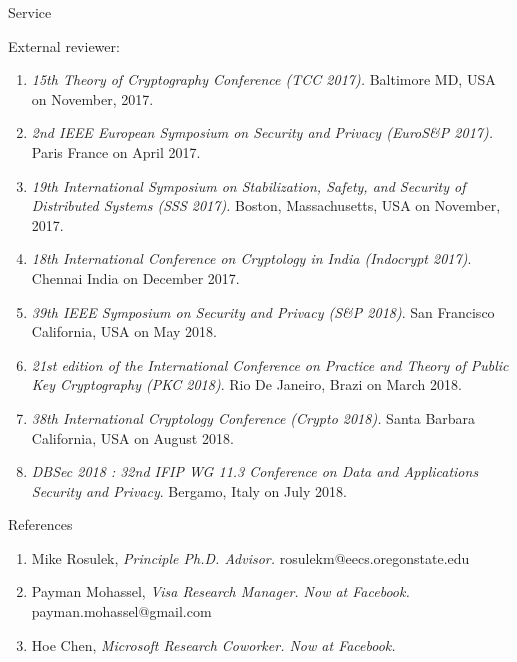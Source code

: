 \documentclass{resume} %
\begin{document}
\begin{rSection}{Service}
	
	External reviewer:
	\begin{enumerate}[label=E\arabic* --]
		
		\item \emph{15th Theory of Cryptography Conference (TCC 2017).}  Baltimore MD, USA on November, 2017.
		
		\item \emph{2nd IEEE European Symposium on Security and Privacy (EuroS\&P 2017).} Paris France on April 2017.
		
		\item \emph{19th International Symposium on Stabilization, Safety, and Security of Distributed Systems (SSS 2017).} Boston, Massachusetts, USA on November, 2017.
		
		\item \emph{ 18th International Conference on Cryptology in India (Indocrypt 2017)}. Chennai India on December 2017.
		
		\item \emph{39th IEEE Symposium on Security and Privacy (S\&P 2018)}. San Francisco California, USA on May 2018.
		
		\item \emph{21st edition of the International Conference on Practice and Theory of Public Key Cryptography (PKC 2018)}. Rio De Janeiro, Brazi on March 2018.
		
		
		\item \emph{ 38th International Cryptology Conference (Crypto 2018).} Santa Barbara California, USA on August 2018.
		
		\item \emph{DBSec 2018 : 32nd IFIP WG 11.3 Conference on Data and Applications Security and Privacy}.  Bergamo, Italy on July 2018.
		
	\end{enumerate}
	
\end{rSection}




\begin{rSection}{References}
	
	\begin{enumerate}[label=R\arabic* --]
		
		\item Mike Rosulek, \emph{Principle Ph.D. Advisor.} rosulekm@eecs.oregonstate.edu
		
		\item Payman Mohassel,  \emph{Visa Research Manager. Now at Facebook.} payman.mohassel@gmail.com 
		
		\item Hoe Chen, \emph{Microsoft Research Coworker.  Now at Facebook.}
		
		
	\end{enumerate}
	
\end{rSection}
\end{document}
